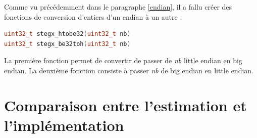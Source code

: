 \documentclass[11pt]{article}
\begin{document}
Comme vu précédemment dans le paragraphe \ref{endian}, il a fallu créer 
des fonctions de conversion d'entiers d'un endian à un autre : 

\begin{lstlisting}[language=c]
uint32_t stegx_htobe32(uint32_t nb)
uint32_t stegx_be32toh(uint32_t nb)
\end{lstlisting}

La première fonction permet de convertir de passer de \textit{nb} little 
endian en big endian. 
La deuxième fonction consiste à passer \textit{nb} de big endian en 
little endian. 

\section{Comparaison entre l'estimation et l'implémentation}
\end{document}
